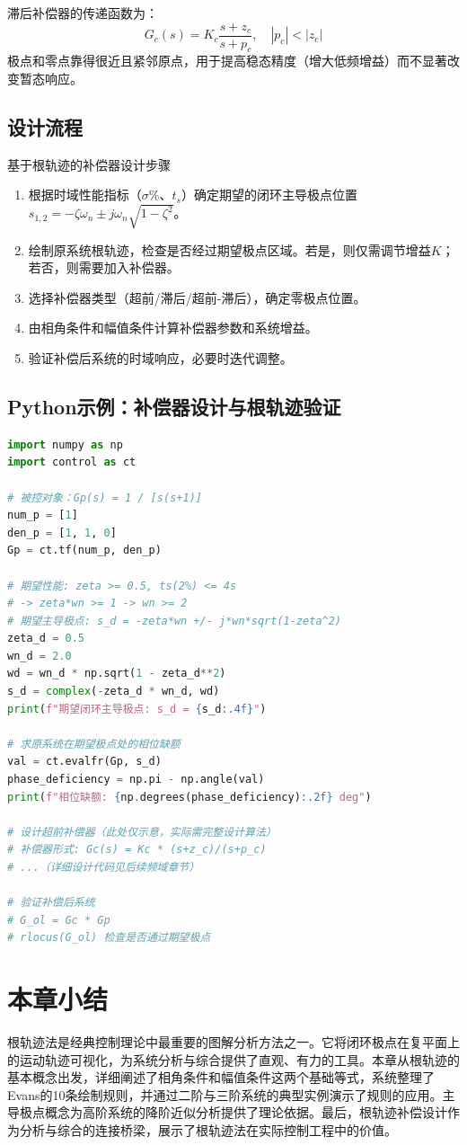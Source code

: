 滞后补偿器的传递函数为：
\[
G_c(s) = K_c \frac{s + z_c}{s + p_c}, \quad |p_c| < |z_c|
\]
极点和零点靠得很近且紧邻原点，用于提高稳态精度（增大低频增益）而不显著改变暂态响应。

\subsection{设计流程}

\begin{myalgorithm}{基于根轨迹的补偿器设计步骤}
\begin{enumerate}
\item 根据时域性能指标（$\sigma\%$、$t_s$）确定期望的闭环主导极点位置$s_{1,2} = -\zeta\omega_n \pm j\omega_n\sqrt{1-\zeta^2}$。
\item 绘制原系统根轨迹，检查是否经过期望极点区域。若是，则仅需调节增益$K$；若否，则需要加入补偿器。
\item 选择补偿器类型（超前/滞后/超前-滞后），确定零极点位置。
\item 由相角条件和幅值条件计算补偿器参数和系统增益。
\item 验证补偿后系统的时域响应，必要时迭代调整。
\end{enumerate}
\end{myalgorithm}

\subsection*{Python示例：补偿器设计与根轨迹验证}

\begin{lstlisting}[language=Python]
import numpy as np
import control as ct

# 被控对象：Gp(s) = 1 / [s(s+1)]
num_p = [1]
den_p = [1, 1, 0]
Gp = ct.tf(num_p, den_p)

# 期望性能: zeta >= 0.5, ts(2%) <= 4s
# -> zeta*wn >= 1 -> wn >= 2
# 期望主导极点: s_d = -zeta*wn +/- j*wn*sqrt(1-zeta^2)
zeta_d = 0.5
wn_d = 2.0
wd = wn_d * np.sqrt(1 - zeta_d**2)
s_d = complex(-zeta_d * wn_d, wd)
print(f"期望闭环主导极点: s_d = {s_d:.4f}")

# 求原系统在期望极点处的相位缺额
val = ct.evalfr(Gp, s_d)
phase_deficiency = np.pi - np.angle(val)
print(f"相位缺额: {np.degrees(phase_deficiency):.2f} deg")

# 设计超前补偿器（此处仅示意，实际需完整设计算法）
# 补偿器形式: Gc(s) = Kc * (s+z_c)/(s+p_c)
# ...（详细设计代码见后续频域章节）

# 验证补偿后系统
# G_ol = Gc * Gp
# rlocus(G_ol) 检查是否通过期望极点
\end{lstlisting}

\section*{本章小结}

根轨迹法是经典控制理论中最重要的图解分析方法之一。它将闭环极点在复平面上的运动轨迹可视化，为系统分析与综合提供了直观、有力的工具。本章从根轨迹的基本概念出发，详细阐述了相角条件和幅值条件这两个基础等式，系统整理了Evans的10条绘制规则，并通过二阶与三阶系统的典型实例演示了规则的应用。主导极点概念为高阶系统的降阶近似分析提供了理论依据。最后，根轨迹补偿设计作为分析与综合的连接桥梁，展示了根轨迹法在实际控制工程中的价值。
